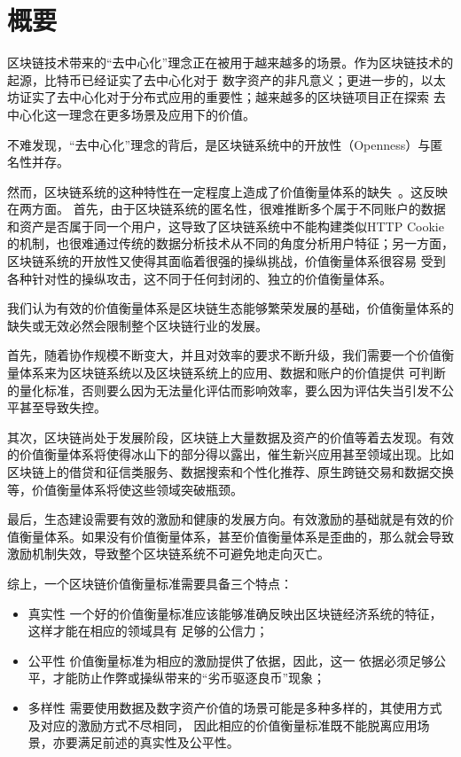 
\section{概要}

区块链技术带来的“去中心化”理念正在被用于越来越多的场景。作为区块链技术的起源，比特币已经证实了去中心化对于
数字资产的非凡意义；更进一步的，以太坊证实了去中心化对于分布式应用的重要性；越来越多的区块链项目正在探索
去中心化这一理念在更多场景及应用下的价值。

不难发现，“去中心化”理念的背后，是区块链系统中的开放性（Openness）与匿名性并存。

然而，区块链系统的这种特性在一定程度上造成了价值衡量体系的缺失~\cite{meiklejohn2013fistful}。这反映在两方面。
首先，由于区块链系统的匿名性，很难推断多个属于不同账户的数据和资产是否属于同一个用户，这导致了区块链系统中不能构建类似HTTP Cookie~\cite{Cookie}
的机制，也很难通过传统的数据分析技术从不同的角度分析用户特征；另一方面，区块链系统的开放性又使得其面临着很强的操纵挑战，价值衡量体系很容易
受到各种针对性的操纵攻击，这不同于任何封闭的、独立的价值衡量体系。

我们认为有效的价值衡量体系是区块链生态能够繁荣发展的基础，价值衡量体系的缺失或无效必然会限制整个区块链行业的发展。

首先，随着协作规模不断变大，并且对效率的要求不断升级，我们需要一个价值衡量体系来为区块链系统以及区块链系统上的应用、数据和账户的价值提供
可判断的量化标准，否则要么因为无法量化评估而影响效率，要么因为评估失当引发不公平甚至导致失控。

其次，区块链尚处于发展阶段，区块链上大量数据及资产的价值等着去发现。有效的价值衡量体系将使得冰山下的部分得以露出，催生新兴应用甚至领域出现。比如区块链上的借贷和征信类服务、数据搜索和个性化推荐、原生跨链交易和数据交换等，价值衡量体系将使这些领域突破瓶颈。

最后，生态建设需要有效的激励和健康的发展方向。有效激励的基础就是有效的价值衡量体系。如果没有价值衡量体系，甚至价值衡量体系是歪曲的，那么就会导致激励机制失效，导致整个区块链系统不可避免地走向灭亡。

综上，一个区块链价值衡量标准需要具备三个特点：

\begin{itemize}
\item{真实性} 一个好的价值衡量标准应该能够准确反映出区块链经济系统的特征，这样才能在相应的领域具有
足够的公信力；
\item{公平性} 价值衡量标准为相应的激励提供了依据，因此，这一
依据必须足够公平，才能防止作弊或操纵带来的“劣币驱逐良币”现象；
\item{多样性} 需要使用数据及数字资产价值的场景可能是多种多样的，其使用方式及对应的激励方式不尽相同，
因此相应的价值衡量标准既不能脱离应用场景，亦要满足前述的真实性及公平性。
\end{itemize}

